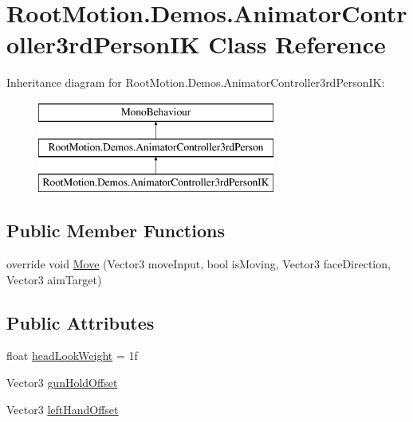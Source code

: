 \hypertarget{class_root_motion_1_1_demos_1_1_animator_controller3rd_person_i_k}{}\section{Root\+Motion.\+Demos.\+Animator\+Controller3rd\+Person\+IK Class Reference}
\label{class_root_motion_1_1_demos_1_1_animator_controller3rd_person_i_k}
Inheritance diagram for Root\+Motion.\+Demos.\+Animator\+Controller3rd\+Person\+IK\+:\begin{figure}[H]
\begin{center}
\leavevmode
\includegraphics[height=3.000000cm]{class_root_motion_1_1_demos_1_1_animator_controller3rd_person_i_k}
\end{center}
\end{figure}
\subsection*{Public Member Functions}
\begin{DoxyCompactItemize}
\item 
override void \mbox{\hyperlink{class_root_motion_1_1_demos_1_1_animator_controller3rd_person_i_k_a0aad38e138a483b9dc302735016d6138}{Move}} (Vector3 move\+Input, bool is\+Moving, Vector3 face\+Direction, Vector3 aim\+Target)
\end{DoxyCompactItemize}
\subsection*{Public Attributes}
\begin{DoxyCompactItemize}
\item 
float \mbox{\hyperlink{class_root_motion_1_1_demos_1_1_animator_controller3rd_person_i_k_a2a01a7c8cd9e342fe96e6732d7d3c7a6}{head\+Look\+Weight}} = 1f
\item 
Vector3 \mbox{\hyperlink{class_root_motion_1_1_demos_1_1_animator_controller3rd_person_i_k_ac53aa3b419f7cef301369759f0b9dc24}{gun\+Hold\+Offset}}
\item 
Vector3 \mbox{\hyperlink{class_root_motion_1_1_demos_1_1_animator_controller3rd_person_i_k_a8b8854330ab946b0cc3774e04d53feda}{left\+Hand\+Offset}}
\end{DoxyCompactItemize}
